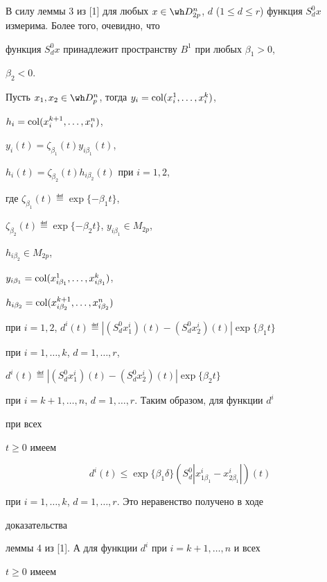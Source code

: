 \begin{pf} 


В силу леммы 3 из [1] для любых $x\in\wh D^n_{2p}$, $d$ ($1\le d\le 


r$) функция $S^0_d x$ измерима. Более того, очевидно, что 


функция $S^0_d x$ принадлежит пространству $B^1$ при любых $\beta_1>0$, 


$\beta_2<0$. 


Пусть $x_1,x_2\in\wh D^n_p$, тогда $y_i=\operatorname{col}(x^1_i,\dotsc,x^k_i)$, 


$h_i=\operatorname{col}(x^{k+1}_i,\dotsc,x^n_i)$, 


$y_i(t)=\zeta_{\beta_1}(t)y_{i\beta_1}(t)$, 


$h_i(t)=\zeta_{\beta_2}(t)h_{i\beta_2}(t)$ при $i=1,2$, 


где $\zeta_{\beta_1}(t)\eqdef\exp\{-\beta_1t\}$, 


$\zeta_{\beta_2}(t)\eqdef\exp\{-\beta_2t\}$, $y_{i\beta_1}\in M_{2p}$, 


$h_{i\beta_2}\in M_{2p}$, 


$y_{i\beta_1}=\operatorname{col}(x^1_{i\beta_1},\dotsc,x^k_{i\beta_1})$, 


$h_{i\beta_2}=\operatorname{col}(x^{k+1}_{i\beta_2},\dotsc,x^n_{i\beta_2})$ 


при $i=1,2$, $d^i(t)\eqdef|(S^0_d x^i_1)(t)-(S^0_d 


x^i_2)(t)|\exp\{\beta_1t\}$ 


при $i=1,\dotsc,k$, $d=1,\dotsc,r$, 


$d^i(t)\eqdef|(S^0_d x^i_1)(t)-(S^0_d 


x^i_2)(t)|\exp\{\beta_2t\}$ 


при $i=k+1,\dotsc,n$, $d=1,\dotsc,r$. Таким образом, для функции $d^i$ 


при всех 


$t\ge0$ имеем 


$$ 


d^i(t)\le\exp\{\beta_1\delta\}(S^0_d|x^i_{1\beta_1} 


-x^i_{2\beta_1}|)(t) 


$$ 


при $i=1,\dotsc,k$, $d=1,\dotsc,r$. Это неравенство получено в ходе 


доказательства 


леммы 4 из [1]. А для функции $d^i$ при $i=k+1,\dotsc,n$ и всех 


$t\ge0$ имеем 


\begin{multline*} 



\end{multline*}
\end{pf}
